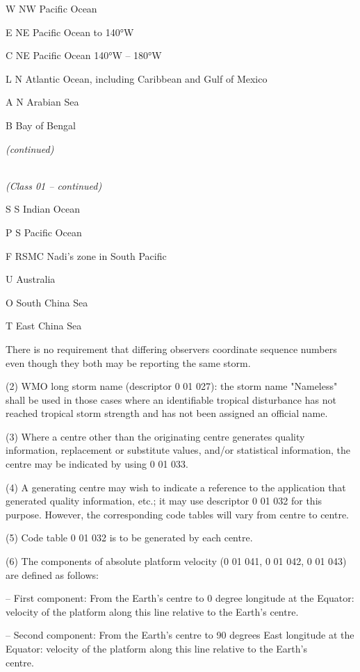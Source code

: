 W NW Pacific Ocean

E NE Pacific Ocean to 140°W

C NE Pacific Ocean 140°W -- 180°W

L N Atlantic Ocean, including Caribbean and Gulf of Mexico

A N Arabian Sea

B Bay of Bengal

\emph{(continued)}

\emph{\\
(Class 01 -- continued)}

S S Indian Ocean

P S Pacific Ocean

F RSMC Nadi's zone in South Pacific

U Australia

O South China Sea

T East China Sea

There is no requirement that differing observers coordinate sequence numbers even though they both may be reporting the same storm.

(2) WMO long storm name (descriptor 0 01 027): the storm name "Nameless" shall be used in those cases where an identifiable tropical disturbance has not reached tropical storm strength and has not been assigned an official name.

(3) Where a centre other than the originating centre generates quality information, replacement or substitute values, and/or statistical information, the centre may be indicated by using 0 01 033.

(4) A generating centre may wish to indicate a reference to the application that generated quality information, etc.; it may use descriptor 0 01 032 for this purpose. However, the corresponding code tables will vary from centre to centre.

(5) Code table 0 01 032 is to be generated by each centre.

(6) The components of absolute platform velocity (0 01 041, 0 01 042, 0 01 043) are defined as follows:

-- First component: From the Earth's centre to 0 degree longitude at the Equator: velocity of the platform along this line relative to the Earth's centre.

-- Second component: From the Earth's centre to 90 degrees East longitude at the Equator: velocity of the platform along this line relative to the Earth's\\
centre.

